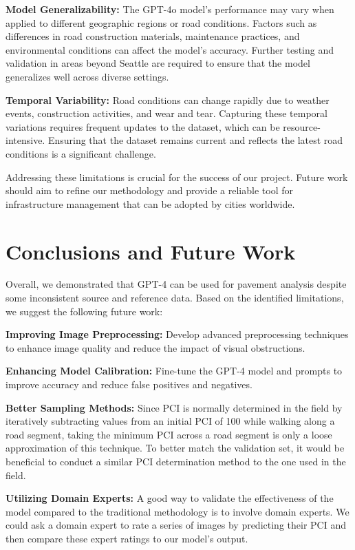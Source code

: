 \documentclass{article}
\begin{document}
\textbf{Model Generalizability:}
The GPT-4o model's performance may vary when applied to different geographic regions or road conditions. Factors such as differences in road construction materials, maintenance practices, and environmental conditions can affect the model's accuracy. Further testing and validation in areas beyond Seattle are required to ensure that the model generalizes well across diverse settings.

\textbf{Temporal Variability:}
Road conditions can change rapidly due to weather events, construction activities, and wear and tear. Capturing these temporal variations requires frequent updates to the dataset, which can be resource-intensive. Ensuring that the dataset remains current and reflects the latest road conditions is a significant challenge.

Addressing these limitations is crucial for the success of our project. Future work should aim to refine our methodology and provide a reliable tool for infrastructure management that can be adopted by cities worldwide.

\section*{Conclusions and Future Work}

Overall, we demonstrated that GPT-4 can be used for pavement analysis despite some inconsistent source and reference data. Based on the identified limitations, we suggest the following future work:

\textbf{Improving Image Preprocessing:}
Develop advanced preprocessing techniques to enhance image quality and reduce the impact of visual obstructions.

\textbf{Enhancing Model Calibration:}
Fine-tune the GPT-4 model and prompts to improve accuracy and reduce false positives and negatives.

\textbf{Better Sampling Methods:}
Since PCI is normally determined in the field by iteratively subtracting values from an initial PCI of 100 while walking along a road segment, taking the minimum PCI across a road segment is only a loose approximation of this technique. To better match the validation set, it would be beneficial to conduct a similar PCI determination method to the one used in the field.

\textbf{Utilizing Domain Experts:}
A good way to validate the effectiveness of the model compared to the traditional methodology is to involve domain experts. We could ask a domain expert to rate a series of images by predicting their PCI and then compare these expert ratings to our model's output.
\end{document}
